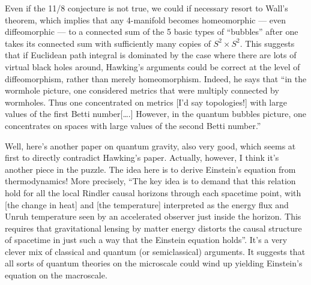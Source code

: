 \documentclass{article}
\def\tightlist{}
\renewcommand{\texttt}[1]{%
  \begingroup
  \ttfamily
  \begingroup\lccode`~=`/\lowercase{\endgroup\def~}{/\discretionary{}{}{}}%
  \begingroup\lccode`~=`[\lowercase{\endgroup\def~}{[\discretionary{}{}{}}%
  \begingroup\lccode`~=`.\lowercase{\endgroup\def~}{.\discretionary{}{}{}}%
  \catcode`/=\active\catcode`[=\active\catcode`.=\active
  \scantokens{#1\noexpand}%
  \endgroup
}
\begin{document}
Even if the 11/8 conjecture is not true, we could if necessary resort to
Wall's theorem, which implies that any 4-manifold becomes homeomorphic
--- even diffeomorphic --- to a connected sum of the 5 basic types of
``bubbles'' after one takes its connected sum with sufficiently many
copies of \(S^2 \times S^2\). This suggests that if Euclidean path
integral is dominated by the case where there are lots of virtual black
holes around, Hawking's arguments could be correct at the level of
diffeomorphism, rather than merely homeomorphism. Indeed, he says that
``in the wormhole picture, one considered metrics that were multiply
connected by wormholes. Thus one concentrated on metrics {[}I'd say
topologies!{]} with large values of the first Betti number{[}\ldots.{]}
However, in the quantum bubbles picture, one concentrates on spaces with
large values of the second Betti number.''


Well, here's another paper on quantum gravity, also very good, which
seems at first to directly contradict Hawking's paper. Actually,
however, I think it's another piece in the puzzle. The idea here is to
derive Einstein's equation from thermodynamics! More precisely, ``The
key idea is to demand that this relation hold for all the local Rindler
causal horizons through each spacetime point, with {[}the change in
heat{]} and {[}the temperature{]} interpreted as the energy flux and
Unruh temperature seen by an accelerated observer just inside the
horizon. This requires that gravitational lensing by matter energy
distorts the causal structure of spacetime in just such a way that the
Einstein equation holds''. It's a very clever mix of classical and
quantum (or semiclassical) arguments. It suggests that all sorts of
quantum theories on the microscale could wind up yielding Einstein's
equation on the macroscale.

\end{document}
